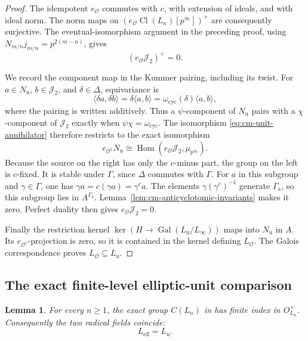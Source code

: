 \documentclass[11pt]{article}
\newtheorem{lemma}[theorem]{Lemma}
\theoremstyle{definition}\newtheorem{definition}[theorem]{Definition}
\begin{document}
\begin{proof}
The idempotent \(e_{\mathcal O}\) commutes with \(c\), with
extension of ideals, and with ideal norm.
The norm maps on
\((e_{\mathcal O}\operatorname{Cl}(L_n)[p^\infty])^+\)
are consequently surjective.
The eventual-isomorphism argument in the preceding proof,
using \(N_{m/n}j_{m/n}=p^{2(m-n)}\), gives
\[
                      (e_{\mathcal O}\mathcal J_2)^+=0.
\]

We record the component map in the Kummer pairing, including
its twist.  For \(a\in N_{\mathrm u}\),
\(b\in\mathcal J_2\), and \(\delta\in\Delta\), equivariance is
\[
              \langle\delta a,\delta b\rangle
                    =\delta\langle a,b\rangle
                    =\omega_{\mathrm{cyc}}(\delta)
                                         \langle a,b\rangle,
\]
where the pairing is written additively.
Thus a \(\psi\)-component of \(N_{\mathrm u}\) pairs with a
\(\chi\)-component of \(\mathcal J_2\) exactly when
\(\psi\chi=\omega_{\mathrm{cyc}}\).
The isomorphism \eqref{eq:cm-unit-annihilator} therefore
restricts to the exact isomorphism
\[
 e_{\mathcal O^\dagger}N_{\mathrm u}
       \cong
 \operatorname{Hom}(e_{\mathcal O}\mathcal J_2,
                                      \mu_{p^\infty}).
\]
Because the source on the right has only the \(c\)-minus part,
the group on the left is \(c\)-fixed.
It is stable under \(\Gamma\), since \(\Delta\) commutes with
\(\Gamma\).
For \(a\) in this subgroup and \(\gamma\in\Gamma\), one has
\(\gamma a=c(\gamma a)=\gamma^c a\).
The elements \(\gamma(\gamma^c)^{-1}\) generate
\(\Gamma_{\mathrm a}\), so this subgroup lies in
\(A^{\Gamma_{\mathrm a}}\).
Lemma~\ref{lem:cm-anticyclotomic-invariants} makes it zero.
Perfect duality then gives \(e_{\mathcal O}\mathcal J_2=0\).

Finally the restriction kernel
\(\ker(H\to\operatorname{Gal}(L_{\mathrm u}/L_\infty))\)
maps into \(N_{\mathrm u}\) in \(A\).
Its \(e_{\mathcal O^\dagger}\)-projection is zero, so it is
contained in the kernel defining \(L_{\mathcal O}\).
The Galois correspondence proves
\(L_{\mathcal O}\subseteq L_{\mathrm u}\).
\end{proof}

\subsection{The exact finite-level elliptic-unit comparison}
\label{subsec:cm-unit-index}

\begin{lemma}\label{lem:cm-unit-radical-comparison}
For every \(n\geq1\), the exact group \(C(L_n)\) in
\cite[Definition 2.2, p.~8]{IshiiSoule} has finite index in
\(O_{L_n}^{\times}\).
Consequently the two radical fields coincide:
\[
                         L_{\mathrm{ell}}=L_{\mathrm u}.
\]
\end{lemma}
\end{document}
